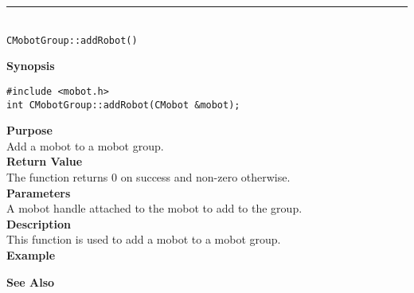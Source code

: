 \noindent
\vspace{5pt}
\rule{4.5in}{0.015in}\\
\noindent
{\LARGE \texttt{CMobotGroup::addRobot()}}\\
{}

\noindent
{\bf Synopsis}
\vspace{-8pt}
\begin{verbatim}
#include <mobot.h>
int CMobotGroup::addRobot(CMobot &mobot);
\end{verbatim}

\noindent
{\bf Purpose}\\
Add a mobot to a mobot group.\\

\noindent
{\bf Return Value}\\
The function returns 0 on success and non-zero otherwise.\\

\noindent
{\bf Parameters}\\
A mobot handle attached to the mobot to add to the group.\\

\noindent
{\bf Description}\\
This function is used to add a mobot to a mobot group. \\
\noindent
{\bf Example}\\
\noindent

\noindent
{\bf See Also}\\

